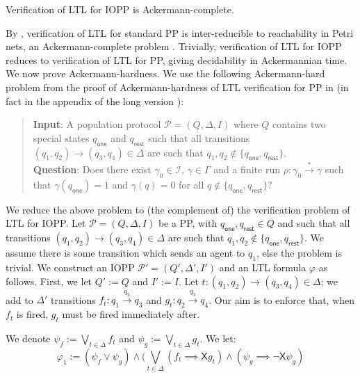 \documentclass[10pt,a4paper]{article}
\newcommand{\set}[1]{\{#1\}}
\newcommand{\deff}{:=}
\newcommand{\biglor}{\bigvee}
\newcommand{\config}{\gamma}
\newcommand{\configs}{\Gamma}
\newcommand{\initialstates}{I}
\newcommand{\initialconfigs}{\mathcal{I}}
\newcommand{\step}[1]{\xrightarrow{#1}}
\newcommand{\run}{\rho}
\newcommand{\transitions}{\Delta}
\newcommand*{\states}{Q}
\newcommand{\PP}{\mathcal{P}}                  %
\newcommand{\trans}[1]{\xrightarrow{#1}}       %
\newcommand{\ltlnext}{\mathsf{X}}
\newcommand{\stateone}{q_{\mathsf{one}}}
\newcommand{\staterest}{q_{\mathsf{rest}}}
\begin{document}
\begin{propositionrep}
	\label{prop:iopp-ltl-ack}
	Verification of LTL for IOPP is Ackermann-complete.
\end{propositionrep}
\begin{appendixproof}
	By \cite{EGLM16}, verification of LTL for standard PP is inter-reducible to reachability in Petri nets, an Ackermann-complete problem \cite{Leroux2022,Czerwinski2022}.
	Trivially, verification of LTL for IOPP reduces to verification of LTL for PP, giving decidability in Ackermannian time.
	We now prove Ackermann-hardness.
	We use the following Ackermann-hard problem from the proof of Ackermann-hardness of LTL verification for PP in  \cite{EGLM16} (in fact in the appendix of the long version \cite{EGLM16longversion}):
	\begin{quote}
		{\textbf{Input}: A population protocol \(\PP= (\states,\transitions,\initialstates)\) where \(\states\) contains two special states \(\stateone\) and \(\staterest\) such that all transitions \((q_1,q_2) \trans{} (q_3,q_4) \in \transitions\) are such that \(q_1,q_2 \notin \set{\stateone, \staterest}\).   \\
			\textbf{Question}: Does there exist \(\config_0 \in \initialconfigs\), \(\config \in \configs\) and a finite run \(\run: \config_0 \step{*} \config\) such that \(\config(\stateone) = 1\) and \(\config(q) = 0\) for all \(q \notin \set{\stateone, \staterest}\)?}
	\end{quote}
	We reduce the above problem to (the complement of) the verification problem of LTL for IOPP.
	Let \(\PP = (\states, \transitions, \initialstates)\) be a PP, with \(\stateone, \staterest \in \states\) and such that all transitions \((q_1,q_2) \trans{} (q_3,q_4) \in \transitions\) are such that \(q_1,q_2 \notin \set{\stateone, \staterest}\).
	We assume there is some transition which sends an agent to \(q_1\), else the problem is trivial.
	We construct an IOPP \(\PP' = (\states', \transitions', \initialstates')\) and an LTL formula \(\varphi\) as follows.
	First, we let \(\states' \deff \states\) and \(\initialstates' \deff \initialstates\).
	Let \(t:(q_1,q_2)\trans{}(q_3,q_4) \in \transitions\); we add to \(\transitions'\) transitions \(f_t: q_1\trans{q_2}q_3\) and \(g_t: q_2\trans{q_3}q_4\).
	Our aim is to enforce that, when \(f_t\) is fired, \(g_t\) must be fired immediately after.

	We denote \(\psi_f \deff \biglor_{t \in \transitions} f_t\) and \(\psi_g \deff \biglor_{t \in \transitions} g_t\).
	We let: \[ \varphi_1 \deff (\psi_f \lor \psi_g) \land (\biglor_{t \in \transitions} (f_t \implies \ltlnext g_t) \land (\psi_g \implies \neg \ltlnext \psi_g) \]


\end{appendixproof}
\end{document}
